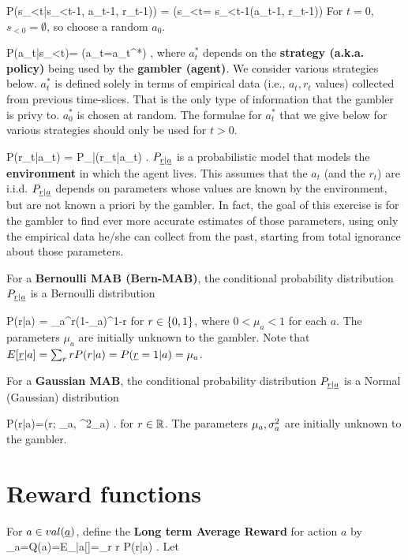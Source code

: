 \beq\color{blue}
P(s_{<t}|s_{<t-1}, a_{t-1}, r_{t-1})) = 
\indi(s_{<t}= s_{<t-1}\cup (a_{t-1}, r_{t-1}))
\eeq
For $t=0$, $s_{<0}=\emptyset$, so
 choose a random $a_0$.

\beq\color{blue}
P(a_t|s_{<t})= \indi(a_t=a_t^*)
\;\;
\;,
\eeq
where $a^*_t$ depends on the
 {\bf strategy (a.k.a. policy)} being used
by the {\bf gambler (agent)}.
We consider various
strategies below.
$a^*_t$ is defined
solely in terms
of empirical data
(i.e., $a_t, r_t$
values)
collected from previous 
time-slices.
That is the only  type of
information that
the gambler 
is privy to.
$a_0^*$ is chosen at random.
The formulae for $a_t^*$
that we give below 
for various strategies
should only be used for $t>0$.

\beq\color{blue}
P(r_t|a_t) =
P_{\rvr|\rva}(r_t|a_t)
\;\;
\;.
\eeq
$P_{\rvr|\rva}$
is 
a probabilistic model that
models the {\bf environment}
in which the agent lives.
This 
assumes that the $a_t$ (and the $r_t$)
are i.i.d.
$P_{\rvr|\rva}$ 
depends on parameters
whose values are known
by the environment, 
but 
are not known
a priori
by the gambler.
In fact, the goal
of this exercise is for
the gambler to
 find 
ever more accurate 
estimates of those parameters,
using only the empirical 
data he/she can collect
from the past,
starting from total
ignorance about those parameters.


For a {\bf Bernoulli MAB (Bern-MAB)}, the 
conditional probability 
distribution $P_{\rvr|\rva}$
is
a Bernoulli distribution 

\beq
P(r|a) = \mu_a^r(1-\mu_a)^{1-r}
\eeq
for $r\in \{0,1\}$, where $0<\mu_a<1$ for each $a$.
The parameters $\mu_a$ are initially 
unknown to the gambler.
Note that $E[\rvr|a]=
\sum_r r P(r|a)=P(\rvr=1|a)=\mu_a$.

For a {\bf Gaussian MAB}, the 
conditional probability 
distribution $P_{\rvr|\rva}$
is
a Normal (Gaussian) distribution

\beq
P(r|a)=\caln(r; \mu_a, \s^2_a)
\;.
\eeq
for $r\in{ \mathbb{R}}$.
The parameters $\mu_a, \sigma^2_a$ are initially 
unknown to the gambler.
 
\section{Reward functions}




For $a\in val(\rva)$, define the
{\bf Long term Average Reward} for action $a$ by
\beq
\mu_a=Q(a)=E_{|a}[\rvr]=\sum_r r P(r|a)
\;.
\eeq
Let


